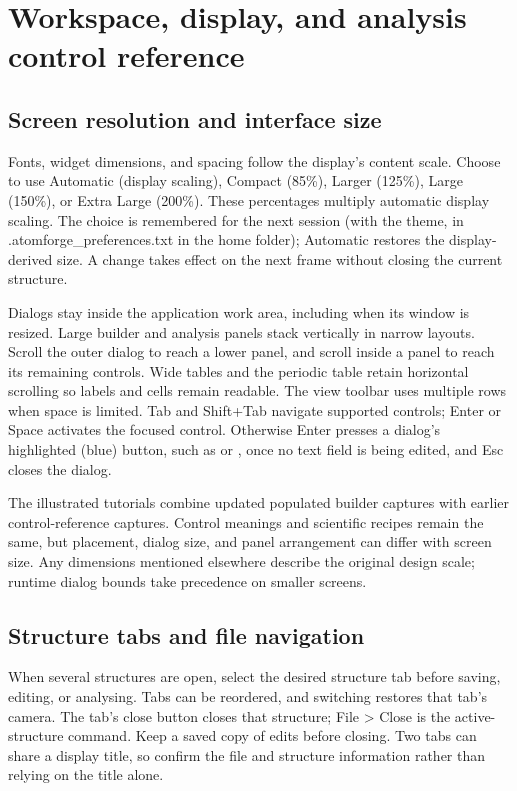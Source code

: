 \section{Workspace, display, and analysis control reference}\label{sec:display-controls}
\subsection{Screen resolution and interface size}
Fonts, widget dimensions, and spacing follow the display's content scale. Choose  to use Automatic (display scaling), Compact (85\%), Larger (125\%), Large (150\%), or Extra Large (200\%). These percentages multiply automatic display scaling. The choice is remembered for the next session (with the theme, in .atomforge\_preferences.txt in the home folder); Automatic restores the display-derived size. A change takes effect on the next frame without closing the current structure.

Dialogs stay inside the application work area, including when its window is resized. Large builder and analysis panels stack vertically in narrow layouts. Scroll the outer dialog to reach a lower panel, and scroll inside a panel to reach its remaining controls. Wide tables and the periodic table retain horizontal scrolling so labels and cells remain readable. The view toolbar uses multiple rows when space is limited. Tab and Shift+Tab navigate supported controls; Enter or Space activates the focused control. Otherwise Enter presses a dialog's highlighted (blue) button, such as  or , once no text field is being edited, and Esc closes the dialog.

The illustrated tutorials combine updated populated builder captures with earlier control-reference captures. Control meanings and scientific recipes remain the same, but placement, dialog size, and panel arrangement can differ with screen size. Any dimensions mentioned elsewhere describe the original design scale; runtime dialog bounds take precedence on smaller screens.

\subsection{Structure tabs and file navigation}
When several structures are open, select the desired structure tab before saving, editing, or analysing. Tabs can be reordered, and switching restores that tab's camera. The tab's close button closes that structure; File > Close is the active-structure command. Keep a saved copy of edits before closing. Two tabs can share a display title, so confirm the file and structure information rather than relying on the title alone.

